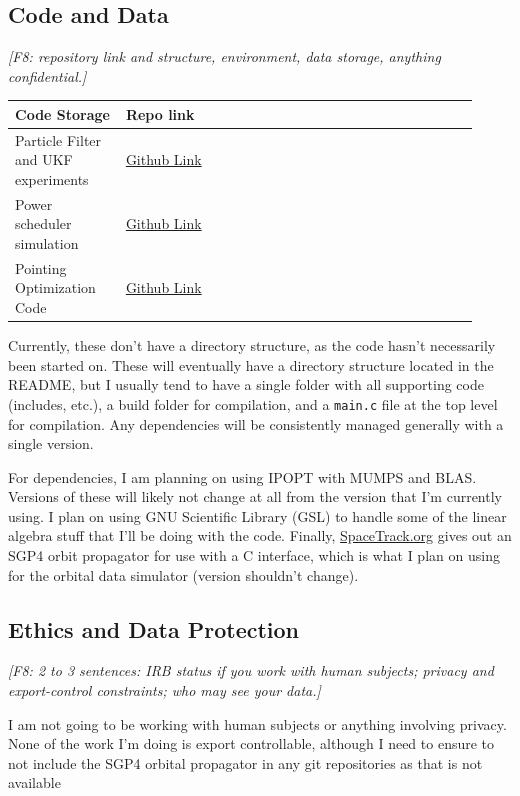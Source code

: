\subsection{Code and Data}
\textit{[F8: repository link and structure, environment, data storage, anything confidential.]}
\begin{longtable}{@{}p{0.22\linewidth}p{0.2\linewidth}p{0.14\linewidth}p{0.18\linewidth}p{0.18\linewidth}@{}}
  \toprule
  Code Storage & Repo link\\
  \midrule
  \endhead
    Particle Filter and UKF experiments & \href{https://github.com/camstillo/ParticleFilterAttitudeEstimator.git}{Github Link} \\
    Power scheduler simulation & \href{https://github.com/camstillo/PowerSchedulerAlgorithms.git}{Github Link} \\
    Pointing Optimization Code & \href{https://github.com/camstillo/PointingOptimizationCubesat.git}{Github Link} \\
  \bottomrule
\end{longtable}

Currently, these don't have a directory structure, as the code hasn't necessarily been started on. These will eventually have a directory structure located in the README, but I usually tend to have a single folder with all supporting code (includes, etc.), a build folder for compilation, and a \texttt{main.c} file at the top level for compilation. Any dependencies will be consistently managed generally with a single version.
 
For dependencies, I am planning on using IPOPT with MUMPS and BLAS. Versions of these will likely not change at all from the version that I'm currently using. I plan on using GNU Scientific Library (GSL) to handle some of the linear algebra stuff that I'll be doing with the code. Finally, \href{https://www.space-track.org/}{SpaceTrack.org} gives out an SGP4 orbit propagator for use with a C interface, which is what I plan on using for the orbital data simulator (version shouldn't change).

\subsection{Ethics and Data Protection}
\textit{[F8: 2 to 3 sentences: IRB status if you work with human subjects; privacy and export-control constraints; who may see your data.]}

I am not going to be working with human subjects or anything involving privacy. None of the work I'm doing is export controllable, although I need to ensure to not include the SGP4 orbital propagator in any git repositories as that is not available 
